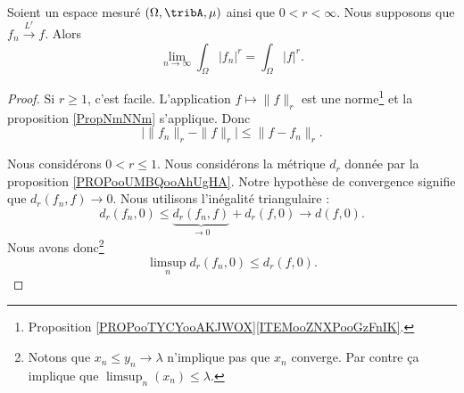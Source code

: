 \begin{proposition}	\label{PROPooXXOYooCUtDZf}
	Soient un espace mesuré \( (\Omega,\tribA,\mu)\) ainsi que \( 0<r<\infty\). Nous supposons que \( f_n\stackrel{ L^r}{\longrightarrow} f\). Alors
	\begin{equation}
		\lim_{n\to\infty}\int_{\Omega}| f_n |^r = \int_{\Omega}| f |^r.
	\end{equation}
\end{proposition}

\begin{proof}
	Si \( r\geq 1\), c'est facile. L'application \( f\mapsto\| f \|_r\) est une norme\footnote{Proposition \ref{PROPooTYCYooAKJWOX}\ref{ITEMooZNXPooGzFnIK}.} et la proposition \ref{PropNmNNm} s'applique. Donc
	\begin{equation}
		\big|  \| f_n \|_r-\| f \|_r \big|\leq \| f-f_n \|_r.
	\end{equation}

	Nous considérons \( 0<r\leq 1\). Nous considérons la métrique \( d_r\) donnée par la proposition \ref{PROPooUMBQooAhUgHA}. Notre hypothèse de convergence signifie que \( d_r(f_n,f)\to 0\). Nous utilisons l'inégalité triangulaire :
	\begin{equation}
		d_r(f_n,0)\leq \underbrace{d_r(f_n,f)}_{\to 0}+d_r(f,0)\to d(f,0).
	\end{equation}
	Nous avons donc\footnote{ Notons que \( x_n\leq y_n\to\lambda\) n'implique pas que \( x_n\) converge. Par contre ça implique que \( \limsup_n(x_n)\leq \lambda\). }
	\begin{equation}		\label{EQooZATHooVuHffk}
		\limsup_nd_r(f_n,0)\leq d_r(f,0).
	\end{equation}


\end{proof}
